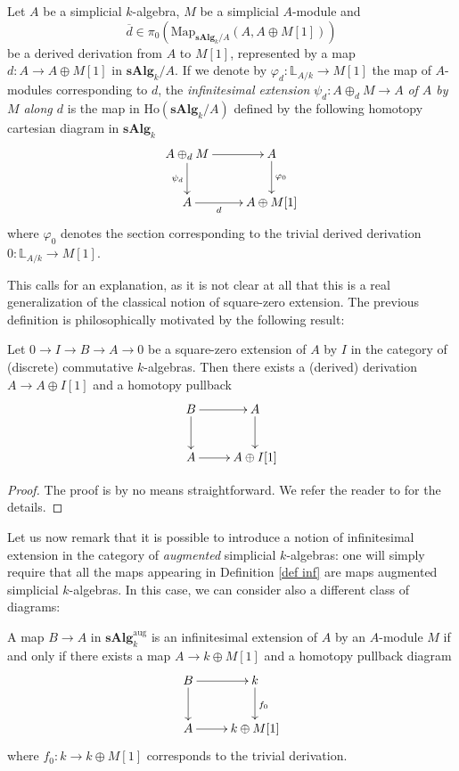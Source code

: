 \begin{refsection}
\begin{defin}\label{def inf}
Let $A$ be a simplicial $k$-algebra, $M$ be a simplicial $A$-module and
\[
\overline{d} \in \pi_0 (\mathrm{Map}_{\mathbf{sAlg}_k/A} (A, A\oplus M[1]))
\]
be a derived derivation from $A$ to $M[1]$, represented by a map $d \colon A \to A \oplus M[1]$ in $\mathbf{sAlg}_k / A$. If we denote by $\varphi_{d}: \mathbb{L}_{A/k}\to M[1]$ the map of $A$-modules corresponding to $d$, the \emph{infinitesimal extension} $\psi_{d}: A \oplus_{d} M \to A$ \emph{of $A$ by $M$ along $d$} is the map in $\mathrm{Ho}(\mathbf{sAlg}_k / A)$ defined by the following homotopy cartesian diagram in $\mathbf{sAlg}_k$
\[
\xymatrix{A \oplus_{d} M \ar[d]_-{\psi_{d}} \ar[r] & A \ar[d]^-{\varphi_0} \\ A \ar[r]_-{d} & A \oplus M[1] }
\]
where $\varphi_0$ denotes the section corresponding to the trivial derived derivation $0 \colon \mathbb L_{A/k} \to M[1]$.
\end{defin}

This calls for an explanation, as it is not clear at all that this is a real generalization of the classical notion of square-zero extension. The previous definition is philosophically motivated by the following result:

\begin{prop}
Let $0 \to I \to B \to A \to 0$ be a square-zero extension of $A$ by $I$ in the category of (discrete) commutative $k$-algebras. Then there exists a (derived) derivation $A \to A \oplus I[1]$ and a homotopy pullback
\[
\xymatrix{
B \ar[r] \ar[d] & A \ar[d] \\ A \ar[r] & A \oplus I[1]
}
\]
\end{prop}

\begin{proof}
The proof is by no means straightforward. We refer the reader to \cite[Theorem 3.1]{infinitesimalextension} for the details.
\end{proof}

Let us now remark that it is possible to introduce a notion of infinitesimal extension in the category of \emph{augmented} simplicial $k$-algebras: one will simply require that all the maps appearing in Definition \ref{def inf} are maps augmented simplicial $k$-algebras. In this case, we can consider also a different class of diagrams:

\begin{lemma}
A map $B \to A$ in $\mathbf{sAlg}_k^{\mathrm{aug}}$ is an infinitesimal extension of $A$ by an $A$-module $M$ if and only if there exists a map $A \to k \oplus M[1]$ and a homotopy pullback diagram
\begin{equation} \label{eq reduced homotopy pullback}
\xymatrix{
B \ar[r] \ar[d] & k \ar[d]^{f_0} \\ A \ar[r] & k \oplus M[1]
}
\end{equation}
where $f_0 \colon k \to k \oplus M[1]$ corresponds to the trivial derivation.
\end{lemma}


\end{refsection}
